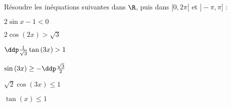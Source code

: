 
\begin{exercice}   \;
R\'esoudre les in\'equations suivantes dans $\R$, puis dans $\lbrack 0,2\pi\lbrack$ et $\rbrack -\pi,\pi\rbrack$ :
\begin{enumerate}
\begin{minipage}[t]{0.45\textwidth}
\item $2\sin{x}-1<0$
\item $2\cos{(2x)}>\sqrt{3}$
\item $\ddp\frac{1}{\sqrt{3}}\tan{(3x)}>1$
\end{minipage}
\begin{minipage}[t]{0.45\textwidth}
\item $\sin{(3x)}\geq -\ddp\frac{\sqrt{3}}{2}$
\item $\sqrt{2}\cos{(3x)}\leq 1$
\item $\tan{(x)}\leq 1$
\end{minipage}
\end{enumerate}
\end{exercice}